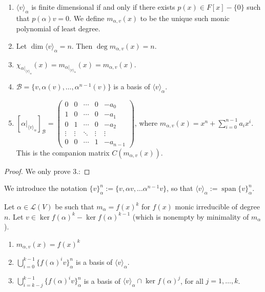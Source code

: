 \documentclass{scrartcl}
\def\L{\mathcal{L}}
\def\B{\mathcal{B}}
\DeclareMathOperator{\spn}{span}  %
\begin{document}
\begin{proposition}
	\begin{enumerate}
		\item $\langle v \rangle_\alpha$ is finite dimensional if and only if there exists $p(x) \in F[x]-\{0\}$ such that $p(\alpha)v=0$. We define $m_{\alpha, v}(x)$ to be the unique such monic polynomial of least degree. 
		\item Let $\dim{\langle v \rangle_\alpha} = n$. Then $\deg{m_{\alpha, v}(x)} = n$. 
		\item $\chi_{\alpha \vert_{\langle v \rangle_\alpha}}(x) = m_{\alpha\vert_{\langle v \rangle_\alpha}}(x) = m_{\alpha, v}(x)$.
		\item $\B = \{v, \alpha(v), \dots, \alpha^{n-1}(v)\}$ is a basis of $\langle v \rangle_\alpha$.
		\item $[\alpha \vert_{\langle v \rangle_\alpha}]_\B = \begin{pmatrix}
			0 & 0 & \cdots & 0 & -a_0 \\
			1 & 0 & \cdots & 0 & -a_1 \\
			0 & 1 & \cdots & 0 & -a_2 \\
			\vdots & \vdots & \ddots & \vdots & \vdots \\
			0 & 0 & \cdots & 1 & -a_{n-1} 
		\end{pmatrix}$, where $m_{\alpha, v}(x) = x^n+\sum_{i=0}^{n-1}a_ix^i$. This is the companion matrix $C(m_{\alpha, v}(x))$. 
	\end{enumerate}
\end{proposition}
\begin{proof}
	We only prove 3.:
\end{proof}
We introduce the notation $\{v\}_\alpha^n := \{v, \alpha v, \dots \alpha^{n-1}v\}$, so that $\langle v \rangle_\alpha := \spn\{v\}_\alpha^n$.
\begin{lemma}
	Let $\alpha \in \L(V)$ be such that $m_\alpha = f(x)^k$ for $f(x)$ monic irreducible of degree $n$. Let $v \in \ker f(\alpha)^k - \ker f(\alpha)^{k-1}$ (which is nonempty by minimality of $m_\alpha$). \begin{enumerate}
		\item $m_{\alpha, v}(x) = f(x)^k$
		\item $\bigcup_{i=0}^{k-1}\{f(\alpha)^iv\}_\alpha^n$ is a basis of $\langle v \rangle_\alpha$.
		\item $\bigcup_{i=k-j}^{k-1}\{f(\alpha)^iv\}_\alpha^n$ is a basis of $\langle v \rangle_\alpha \cap \ker{f(\alpha)^j}$, for all $j = 1, \dots, k$. 
	\end{enumerate}
\end{lemma}
\end{document}
